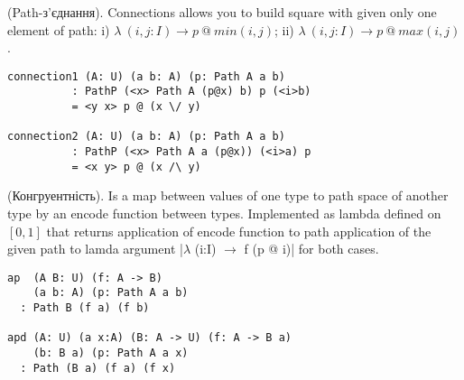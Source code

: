 \begin{definition} (Path-з'єднання).
Connections allows you to build square
with given only one element of path: i) $\lambda\ (i,j: I) \rightarrow p\ @\ min(i,j)$;
ii) $\lambda\ (i,j:I) \rightarrow p\ @\ max(i,j)$.
\begin{center}
\end{center}
\begin{lstlisting}
connection1 (A: U) (a b: A) (p: Path A a b)
          : PathP (<x> Path A (p@x) b) p (<i>b)
          = <y x> p @ (x \/ y)

connection2 (A: U) (a b: A) (p: Path A a b)
          : PathP (<x> Path A a (p@x)) (<i>a) p
          = <x y> p @ (x /\ y)
\end{lstlisting}
\end{definition}

\begin{theorem} (Конгруентність).
Is a map between values of one type
to path space of another type by an encode function between types.
Implemented as lambda defined on $[0,1]$ that returns
application of encode function to path application of
the given path to lamda argument |$\lambda$ (i:I) $\rightarrow$ f (p @ i)|
for both cases.
\begin{lstlisting}
ap  (A B: U) (f: A -> B)
    (a b: A) (p: Path A a b)
  : Path B (f a) (f b)

apd (A: U) (a x:A) (B: A -> U) (f: A -> B a)
    (b: B a) (p: Path A a x)
  : Path (B a) (f a) (f x)
\end{lstlisting}
\end{theorem}


